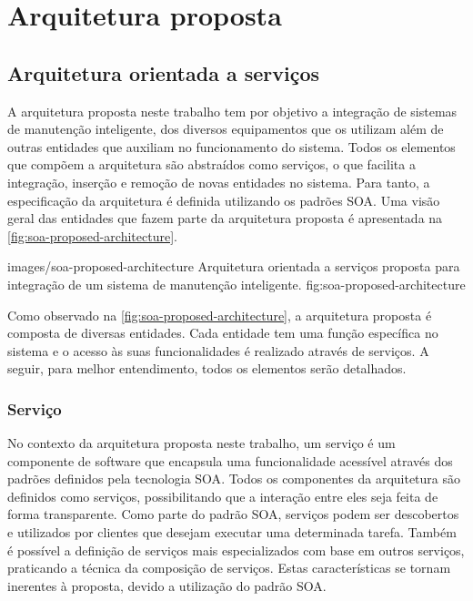 \chapter{Arquitetura proposta}



\section{Arquitetura orientada a serviços}

A arquitetura proposta neste trabalho tem por objetivo a integração de sistemas de manutenção
inteligente, dos diversos equipamentos que os utilizam além de outras entidades que auxiliam no
funcionamento do sistema. Todos os elementos que compõem a arquitetura são abstraídos como serviços,
o que facilita a integração, inserção e remoção de novas entidades no sistema. Para tanto, a
especificação da arquitetura é definida utilizando os padrões \gls{SOA}. Uma visão geral das
entidades que fazem parte da arquitetura proposta é apresentada na
\cref{fig:soa-proposed-architecture}.

    {images/soa-proposed-architecture}
    {Arquitetura orientada a serviços proposta para integração de um sistema de manutenção
        inteligente.}
    {fig:soa-proposed-architecture}

Como observado na \cref{fig:soa-proposed-architecture}, a arquitetura proposta é composta de
diversas entidades. Cada entidade tem uma função específica no sistema e o acesso às suas
funcionalidades é realizado através de serviços. A seguir, para melhor entendimento, todos os
elementos serão detalhados.


\subsection{Serviço}

No contexto da arquitetura proposta neste trabalho, um serviço é um componente de software que
encapsula uma funcionalidade acessível através dos padrões definidos pela tecnologia \gls{SOA}.
Todos os componentes da arquitetura são definidos como serviços, possibilitando que a interação
entre eles seja feita de forma transparente. Como parte do padrão \gls{SOA}, serviços podem ser
descobertos e utilizados por clientes que desejam executar uma determinada tarefa. Também é possível
a definição de serviços mais especializados com base em outros serviços, praticando a técnica da
composição de serviços. Estas características se tornam inerentes à proposta, devido a utilização do
padrão \gls{SOA}.


